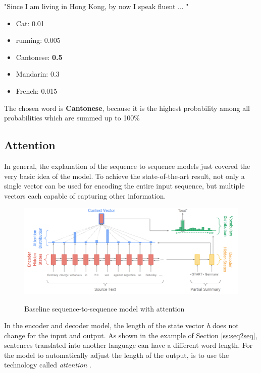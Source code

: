 \begin{tcolorbox}
	"Since I am living in Hong Kong, by now I speak fluent ... "
	
	\begin{itemize}
		\item Cat: 0.01
		\item running: 0.005
		\item Cantonese: \textbf{0.5}
		\item Mandarin: 0.3
		\item French: 0.015
	\end{itemize}

	The chosen word is \textbf{Cantonese}, because it is the highest probability among all probabilities which are summed up to 100\%
\end{tcolorbox}
 

\subsection{Attention}\label{ss:atten}
In general, the explanation of the sequence to sequence models just covered the very basic idea of the model. To achieve the state-of-the-art result, not only a single vector can be used for encoding the entire input sequence, but multiple vectors each capable of capturing other information. 

\begin{figure}
	\begin{center}
		\includegraphics[width=6.5in]{photos/attenion}\\
		\caption{Baseline sequence-to-sequence model with attention \cite{see-etal-2017-get} }\label{attention1}
	\end{center}
\end{figure}

In the encoder and decoder model, the length of the state vector \textit{h} does not change for the input and output. As shown in the example of Section \ref{ss:seq2seq}, sentences translated into another language can have a different word length. For the model to automatically adjust the length of the output, is to use the technology called \textit{attention} \cite{attention} \cite{attention2}.

